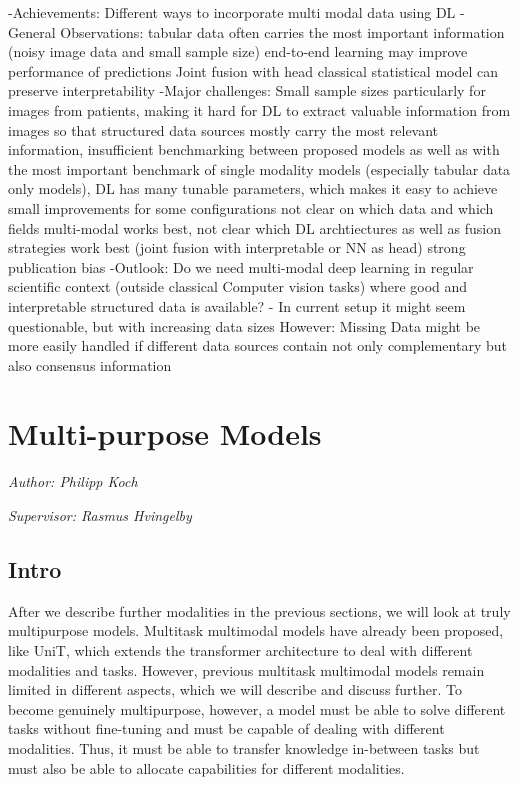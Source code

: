 \documentclass[
]{krantz}
\begin{document}
-Achievements: Different ways to incorporate multi modal data using DL
-General Observations:
tabular data often carries the most important information (noisy image data and small sample size)
end-to-end learning may improve performance of predictions
Joint fusion with head classical statistical model can preserve interpretability
-Major challenges: Small sample sizes particularly for images from patients,
making it hard for DL to extract valuable information from images so that structured data sources mostly carry the most relevant information,
insufficient benchmarking between proposed models as well as with the most important benchmark of single modality models (especially tabular data only models), DL has many tunable parameters, which makes it easy to achieve small improvements for some configurations
not clear on which data and which fields multi-modal works best, not clear which DL archtiectures as well as fusion strategies work best (joint fusion with interpretable or NN as head)
strong publication bias
-Outlook: Do we need multi-modal deep learning in regular scientific context (outside classical Computer vision tasks) where good and interpretable structured data is available? - In current setup it might seem questionable, but with increasing data sizes
However: Missing Data might be more easily handled if different data sources contain not only complementary but also consensus information

\hypertarget{multi-purpose-models}{%
\section{Multi-purpose Models}\label{multi-purpose-models}}

\emph{Author: Philipp Koch}

\emph{Supervisor: Rasmus Hvingelby}

\hypertarget{intro-3}{%
\subsection{Intro}\label{intro-3}}

After we describe further modalities in the previous sections, we will look at truly multipurpose models. Multitask multimodal models have already been proposed, like UniT, which extends the transformer architecture to deal with different modalities and tasks. However, previous multitask multimodal models remain limited in different aspects, which we will describe and discuss further. To become genuinely multipurpose, however, a model must be able to solve different tasks without fine-tuning and must be capable of dealing with different modalities. Thus, it must be able to transfer knowledge in-between tasks but must also be able to allocate capabilities for different modalities.
\end{document}
